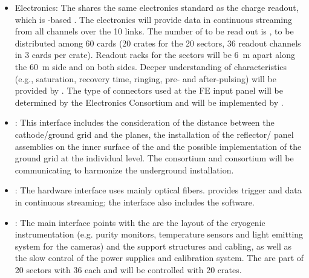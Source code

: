 
\begin{itemize}

\item {} Electronics: The  shares the same  electronics standard as the charge readout, which is -based \cite{utca}. The  electronics will provide data in continuous streaming %
from all  channels over the \SI{10}{\Gbps} links. The number of %
to be read out is \dpnumpmtch, to be distributed among \num{60}  cards (\num{20}  crates for the \num{20}  sectors, \num{36} readout channels in \num{3}  cards per crate). Readout racks for the sectors will be \SI{6}{\m} apart along the \SI{60}{\m} side and on both sides. Deeper understanding of  characteristics
 (e.g., saturation, recovery time, ringing, pre- and after-pulsing) will be provided by  . The type of connectors used at the FE input panel will be determined by the  Electronics Consortium and will be implemented by  .

\item {}: This interface includes the consideration of the distance between the cathode/ground grid and the  planes, the installation of the reflector/ panel assemblies on the inner surface of the  and the possible implementation of the ground grid at the individual  level. The  consortium and  consortium will be communicating to harmonize the underground installation.

\item {}: The hardware interface uses mainly optical fibers.   provides trigger and data in continuous streaming;  the interface also includes the  software.

\item {}: The main interface points with the  are the layout of the cryogenic instrumentation (e.g. purity monitors, temperature sensors and light emitting system for the cameras) and the  support structures and cabling, as well as the slow control of the  power supplies and calibration system. The   are part of \num{20} sectors with \num{36}  each and will be controlled with \num{20}  crates.


\end{itemize}
